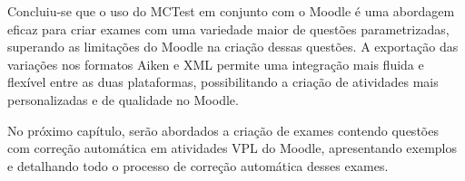 Concluiu-se que o uso do MCTest em conjunto com o Moodle é uma abordagem eficaz para criar exames com uma variedade maior de questões parametrizadas, superando as limitações do Moodle na criação dessas questões. A exportação das variações nos formatos Aiken e XML permite uma integração mais fluida e flexível entre as duas plataformas, possibilitando a criação de atividades mais personalizadas e de qualidade no Moodle.

No próximo capítulo, serão abordados a criação de exames contendo questões com correção automática em atividades VPL do Moodle, apresentando exemplos e detalhando todo o processo de correção automática desses exames.
